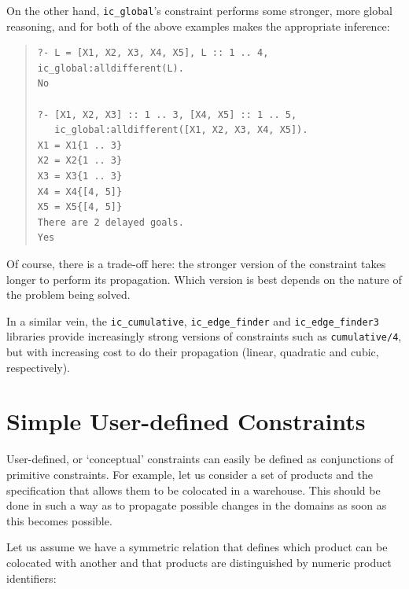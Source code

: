 On the other hand, \texttt{ic_global}'s
constraint performs some stronger, more global reasoning, and for both of
the above examples makes the appropriate inference:

\begin{quote}\begin{verbatim}
?- L = [X1, X2, X3, X4, X5], L :: 1 .. 4, ic_global:alldifferent(L).
No

?- [X1, X2, X3] :: 1 .. 3, [X4, X5] :: 1 .. 5,
   ic_global:alldifferent([X1, X2, X3, X4, X5]).
X1 = X1{1 .. 3}
X2 = X2{1 .. 3}
X3 = X3{1 .. 3}
X4 = X4{[4, 5]}
X5 = X5{[4, 5]}
There are 2 delayed goals.
Yes
\end{verbatim}\end{quote}

Of course, there is a trade-off here: the stronger version of the constraint
takes longer to perform its propagation.  Which version is best depends on
the nature of the problem being solved.



In a similar vein, the \texttt{ic_cumulative}, \texttt{ic_edge_finder} and
\texttt{ic_edge_finder3} libraries provide increasingly strong versions of
constraints such as \texttt{cumulative/4}, but with increasing cost to do
their propagation (linear, quadratic and cubic, respectively).



\section{Simple User-defined Constraints}
User-defined, or `conceptual' constraints can easily be defined as 
conjunctions of primitive constraints. For example, let us consider a set 
of products and the specification that allows them to be colocated in a 
warehouse. This should be done in such a way as to propagate possible 
changes in the domains as soon as this becomes possible.  

Let us assume we have a symmetric relation that defines which product
can be colocated with another and that products are distinguished by numeric 
product identifiers: 

